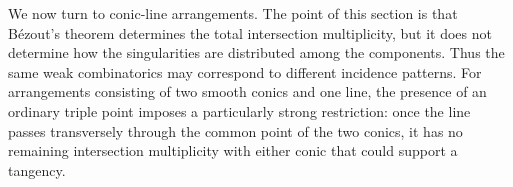 \documentclass[11pt]{article}
\theoremstyle{plain}
\theoremstyle{definition}
\begin{document}

We now turn to conic-line arrangements. The point of this section is that B\'ezout's theorem determines the total intersection multiplicity, but it does not determine how the singularities are distributed among the components. Thus the same weak combinatorics may correspond to different incidence patterns. For arrangements consisting of two smooth conics and one line, the presence of an ordinary triple point imposes a particularly strong restriction: once the line passes transversely through the common point of the two conics, it has no remaining intersection multiplicity with either conic that could support a tangency.
\end{document}
